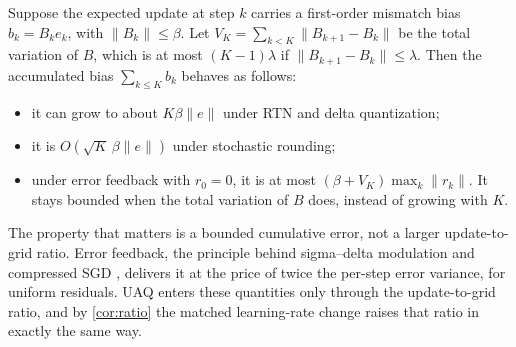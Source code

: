 \begin{corollary}\label{cor:partial-sums}
Suppose the expected update at step $k$ carries a first-order mismatch bias $b_k=B_ke_k$, with $\|B_k\|\le\beta$. Let $V_K=\sum_{k<K}\|B_{k+1}-B_k\|$ be the total variation of $B$, which is at most $(K-1)\lambda$ if $\|B_{k+1}-B_k\|\le\lambda$. Then the accumulated bias $\sum_{k\le K}b_k$ behaves as follows:
\begin{itemize}[leftmargin=*,itemsep=1pt]
\item it can grow to about $K\beta\|e\|$ under RTN and delta quantization;
\item it is $O(\sqrt K\,\beta\|e\|)$ under stochastic rounding;
\item under error feedback with $r_0=0$, it is at most $(\beta+V_K)\max_k\|r_k\|$. It stays bounded when the total variation of $B$ does, instead of growing with $K$.
\end{itemize}
\end{corollary}

The property that matters is a bounded cumulative error, not a larger update-to-grid ratio. Error feedback, the principle behind sigma--delta modulation \citep{gray1990spectra} and compressed SGD \citep{seide2014onebit,stich2018sparsified,karimireddy2019ef}, delivers it at the price of twice the per-step error variance, for uniform residuals. UAQ enters these quantities only through the update-to-grid ratio, and by \cref{cor:ratio} the matched learning-rate change raises that ratio in exactly the same way.
